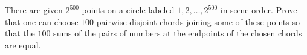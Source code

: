 \begin{problem}

There are given $2^{500}$ points on a circle labeled $1, 2, \dots , 2^{500}$ in some order. Prove that
one can choose $100$ pairwise disjoint chords joining some of these points so that the $100$ sums
of the pairs of numbers at the endpoints of the chosen chords are equal.
\end{problem}





%

